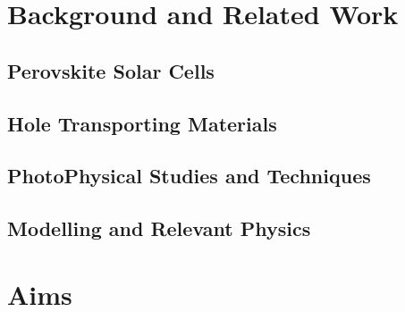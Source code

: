 \section{Background and Related Work}\label{sec:background}

	\subsection{Perovskite Solar Cells}

	\subsection{Hole Transporting Materials}

	\subsection{PhotoPhysical Studies and Techniques}

	\subsection{Modelling and Relevant Physics}


\section{Aims}